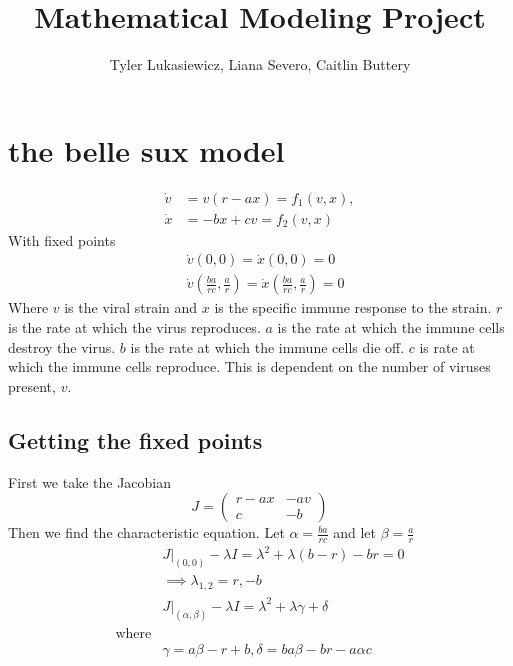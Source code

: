 \documentclass{article}
\title{Mathematical Modeling Project}
\author{Tyler Lukasiewicz, Liana Severo, Caitlin Buttery}
\begin{document}
\maketitle
\section{the belle sux model}
\begin{equation}
    \begin{split}
        \dot v &= v(r-ax) = f_1(v,x), \\
        \dot x &= -bx + cv = f_2(v,x)
    \end{split}
\end{equation}
With fixed points 
\begin{equation}
    \begin{split}
        &\dot v(0,0) =  \dot x(0,0) = 0 \\
        &\dot v(\frac{ba}{rc} ,\frac{a}{r} ) = \dot x(\frac{ba}{rc} ,\frac{a}{r} ) = 0
    \end{split}
\end{equation}
Where $v$ is the viral strain and $x$ is the specific immune response to the strain. $r$ is the rate at which the virus reproduces. $a$ is the rate at which the immune cells destroy the virus. $b$ is the rate at which the immune cells die off. $c$ is rate at which the immune cells reproduce. This is dependent on the number of viruses present, $v$.  
\subsection{Getting the fixed points}
First we take the Jacobian
\begin{equation}
    J =
    \begin{pmatrix}
        r-ax    & -av \\
        c       & -b
    \end{pmatrix}
\end{equation}
Then we find the characteristic equation. Let $\alpha = \frac{ba}{rc} $ and let $\beta = \frac{a}{r} $
\begin{equation}
    \begin{split}
        &J|_{(0,0)} - \lambda I = \lambda^2 + \lambda(b-r) -br = 0\\
        &\implies \lambda_{1,2} = r, -b \\
        &J|_{(\alpha,\beta)}  - \lambda I =  \lambda^2 + \lambda \gamma + \delta\\ 
        \text{where} \\
        &\gamma =  a\beta-r+b, 
        \delta =ba\beta -br-a\alpha c
    \end{split}
\end{equation}
\end{document}
